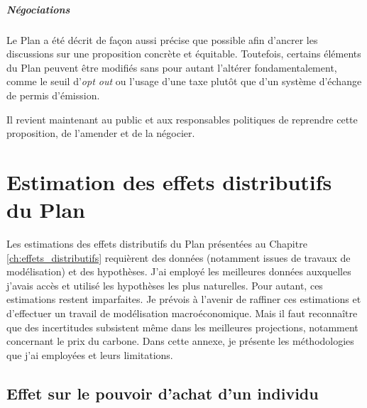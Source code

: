 \documentclass[a5paper,french,openany]{memoir}
\begin{document}
\paragraph{Négociations}

Le Plan a été décrit de façon aussi précise que possible afin d'ancrer les discussions sur une proposition concrète et équitable. Toutefois, certains éléments du Plan peuvent être modifiés sans pour autant l'altérer fondamentalement, comme le seuil d'\textit{opt out} ou l'usage d'une taxe plutôt que d'un système d'échange de permis d'émission. 

Il revient maintenant au public et aux responsables politiques de reprendre cette proposition, de l'amender et de la négocier.



\chapter{Estimation des effets distributifs du Plan
}\label{ch:methodo}

Les estimations des effets distributifs du Plan présentées au Chapitre \ref{ch:effets_distributifs} requièrent des données (notamment issues de travaux de modélisation) et des hypothèses. 
J'ai employé les meilleures données auxquelles j'avais accès et utilisé les hypothèses les plus naturelles. Pour autant, ces estimations restent imparfaites. Je prévois à l'avenir de raffiner ces estimations et d'effectuer un travail de modélisation macroéconomique. Mais il faut reconnaître que des incertitudes subsistent même dans les meilleures projections, notamment concernant le prix du carbone. 
Dans cette annexe, je présente les méthodologies que j'ai employées et leurs limitations.

\section{Effet sur le pouvoir d'achat d'un individu}\label{app:indiv}
\end{document}
